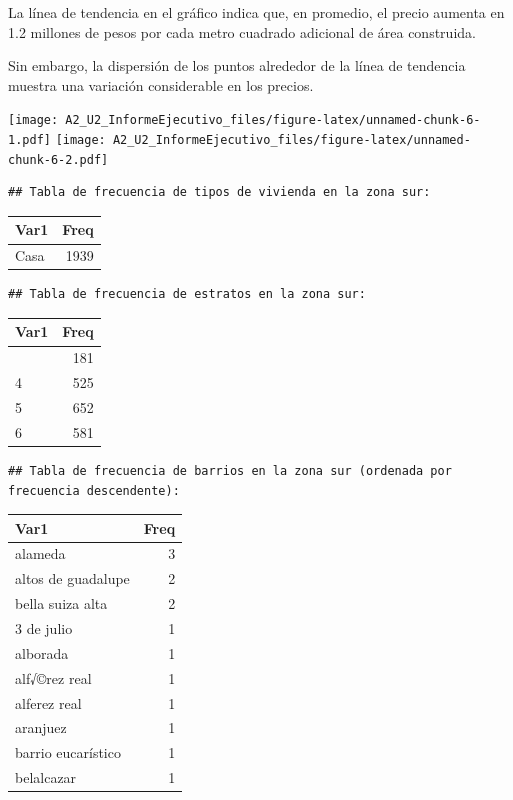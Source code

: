 \documentclass[
]{article}
\begin{document}
La línea de tendencia en el gráfico indica que, en promedio, el precio
aumenta en 1.2 millones de pesos por cada metro cuadrado adicional de
área construida.

Sin embargo, la dispersión de los puntos alrededor de la línea de
tendencia muestra una variación considerable en los precios.

\texttt{[image: A2\_U2\_InformeEjecutivo\_files/figure-latex/unnamed-chunk-6-1.pdf]}
\texttt{[image: A2\_U2\_InformeEjecutivo\_files/figure-latex/unnamed-chunk-6-2.pdf]}

\begin{verbatim}
## Tabla de frecuencia de tipos de vivienda en la zona sur:
\end{verbatim}

\begin{longtable}[]{@{}lr@{}}
\toprule\noalign{}
Var1 & Freq \\
\midrule\noalign{}
\endhead
\bottomrule\noalign{}
\endlastfoot
Casa & 1939 \\
\end{longtable}

\begin{verbatim}
## Tabla de frecuencia de estratos en la zona sur:
\end{verbatim}

\begin{longtable}[]{@{}lr@{}}
\toprule\noalign{}
Var1 & Freq \\
\midrule\noalign{}
\endhead
\bottomrule\noalign{}
\endlastfoot
3 & 181 \\
4 & 525 \\
5 & 652 \\
6 & 581 \\
\end{longtable}

\begin{verbatim}
## Tabla de frecuencia de barrios en la zona sur (ordenada por frecuencia descendente):
\end{verbatim}

\begin{longtable}[]{@{}lr@{}}
\toprule\noalign{}
Var1 & Freq \\
\midrule\noalign{}
\endhead
\bottomrule\noalign{}
\endlastfoot
alameda & 3 \\
altos de guadalupe & 2 \\
bella suiza alta & 2 \\
3 de julio & 1 \\
alborada & 1 \\
alf√©rez real & 1 \\
alferez real & 1 \\
aranjuez & 1 \\
barrio eucarístico & 1 \\
belalcazar & 1 \\
\end{longtable}
\end{document}
